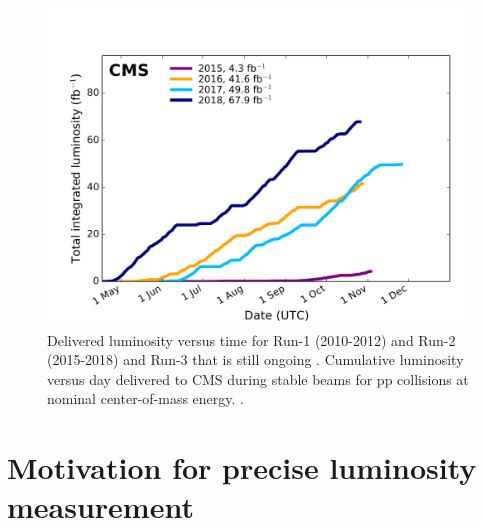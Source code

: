   \begin{center}
  \begin{figure}[ht]
    \centering
    \includegraphics[scale=.55]{Chapter1/int_lumi_cumulative_pp_2_run2.pdf}
    \caption[Delivered integrated luminosity per year]{Delivered luminosity versus time for Run-1 (2010-2012) and Run-2 (2015-2018) and Run-3 that is still ongoing . Cumulative luminosity versus day delivered to CMS during stable beams for pp collisions at nominal center-of-mass energy.  \cite{wikicern}.}
    \label{lumi_per_year_int}
  \end{figure}
    \end{center}
    
\section{Motivation for precise luminosity measurement}    


